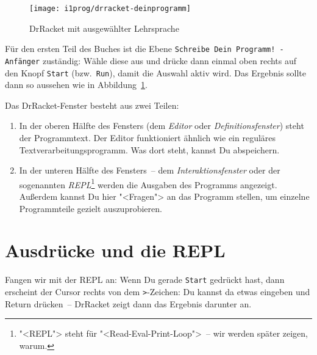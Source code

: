 \begin{figure}[tb]
  \centering
  \texttt{[image: i1prog/drracket-deinprogramm]}
  \caption{DrRacket mit ausgewählter Lehrsprache}
  \label{fig:drracket-deinprogramm}
\end{figure}

Für den ersten Teil des Buches ist die Ebene \texttt{Schreibe Dein
  Programm! - Anfänger} zuständig: Wähle
diese aus und drücke dann einmal oben rechts auf den Knopf
\texttt{Start} (bzw.\ \texttt{Run}), damit die Auswahl aktiv wird.
Das Ergebnis sollte dann so aussehen wie in
Abbildung~\ref{fig:drracket-deinprogramm}.

Das DrRacket-Fenster besteht aus zwei Teilen:
%
\begin{enumerate}
\item In der oberen Hälfte des Fensters (dem
  \textit{Editor} oder
  \textit{Definitionsfenster}) steht der
  Programmtext.  Der Editor funktioniert ähnlich wie ein reguläres
  Textverarbeitungsprogramm.  Was dort steht, kannst Du abspeichern.
\item In der unteren Hälfte des Fensters~-- dem
  \textit{Interaktionsfenster} oder der
  sogenannten \textit{REPL}\footnote{"<REPL"> steht für
    "<Read-Eval-Print-Loop">~-- wir werden später zeigen, warum.}
  werden die Ausgaben des Programms angezeigt.  Außerdem kannst Du
  hier "<Fragen"> an das Programm stellen, um einzelne Programmteile
  gezielt auszuprobieren.
\end{enumerate}
%

\section{Ausdrücke und die REPL}

Fangen wir mit der REPL an: Wenn Du gerade \texttt{Start} gedrückt
hast, dann erscheint der Cursor rechts von dem \lstinline{>}-Zeichen: Du
kannst da etwas eingeben und Return drücken~-- DrRacket zeigt dann
das Ergebnis darunter an.

